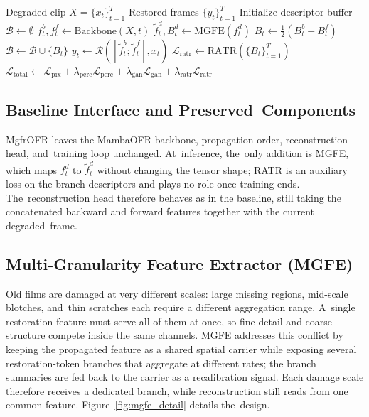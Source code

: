 \documentclass[symmetry,article,accept,pdftex,moreauthors]{Definitions/mdpi}
\begin{document}
\begin{algorithm}[!b]
\small
\caption{MgfrOFR forward pass for a clip of length $T$.\label{alg:mgfrofr}}
\begin{algorithmic}[1]
\Require Degraded clip $X=\{x_t\}_{t=1}^{T}$
\Ensure Restored frames $\{y_t\}_{t=1}^{T}$
\State Initialize descriptor buffer $\mathcal{B} \leftarrow \emptyset$
    \State $f_t^{b}, f_t^{f} \leftarrow \text{Backbone}(X, t)$ 
        \State $\widetilde{f}_t^{d}, B_t^{d} \leftarrow \text{MGFE}(f_t^{d})$ 
    \EndFor
    \State $B_t \leftarrow \frac{1}{2}(B_t^{b} + B_t^{f})$ 
    \State $\mathcal{B} \leftarrow \mathcal{B} \cup \{B_t\}$ 
    \State $y_t \leftarrow \mathcal{R}([\widetilde{f}_t^{b}; \widetilde{f}_t^{f}], x_t)$ 
\EndFor
{}
    \State $\mathcal{L}_{\text{ratr}} \leftarrow \text{RATR}(\{B_t\}_{t=1}^{T})$ 
    \State $\mathcal{L}_{\text{total}} \leftarrow \mathcal{L}_{\text{pix}} + \lambda_{\text{perc}}\mathcal{L}_{\text{perc}} + \lambda_{\text{gan}}\mathcal{L}_{\text{gan}} + \lambda_{\text{ratr}}\mathcal{L}_{\text{ratr}}$
\EndIf
\end{algorithmic}
\end{algorithm}

\subsection{Baseline Interface and Preserved~Components}
\label{subsec:baseline_interface}

MgfrOFR leaves the MambaOFR backbone, propagation order, reconstruction head, and~training loop unchanged. At~inference, the~only addition is MGFE, which maps $f_t^{d}$ to $\widetilde{f}_t^{d}$ without changing the tensor shape; RATR is an auxiliary loss on the branch descriptors and plays no role once training ends. The~reconstruction head therefore behaves as in the baseline, still taking the concatenated backward and forward features together with the current degraded~frame.

\subsection{Multi-Granularity Feature Extractor (MGFE)}
\label{subsec:mgfe}

Old films are damaged at very different scales: large missing regions, mid-scale blotches, and~thin scratches each require a different aggregation range. A~single restoration feature must serve all of them at once, so fine detail and coarse structure compete inside the same channels. MGFE addresses this conflict by keeping the propagated feature as a shared spatial carrier while exposing several restoration-token branches that aggregate at different rates; the branch summaries are fed back to the carrier as a recalibration signal. Each damage scale therefore receives a dedicated branch, while reconstruction still reads from one common feature. Figure~\ref{fig:mgfe_detail} details the~design.
\end{document}
